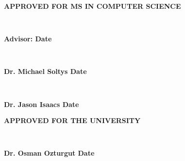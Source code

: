 \begin{center}
{\large \bfseries APPROVED FOR MS IN COMPUTER SCIENCE \par}

\vspace{1.5 cm}

\hrulefill\\
{\large \bfseries Advisor: \advisorname \hfill Date \par}

\vspace{1.5 cm}

\hrulefill\\
{\large \bfseries Dr. Michael Soltys \hfill Date \par}
\vspace{1.5 cm}

\hrulefill\\
{\large \bfseries Dr. Jason Isaacs \hfill Date \par}
\vspace{3 cm}

{\large \bfseries APPROVED FOR THE UNIVERSITY \par}

\vspace{1.5 cm}

\hrulefill\\
{\large \bfseries Dr. Osman Ozturgut \hfill Date \par}
\end{center}
